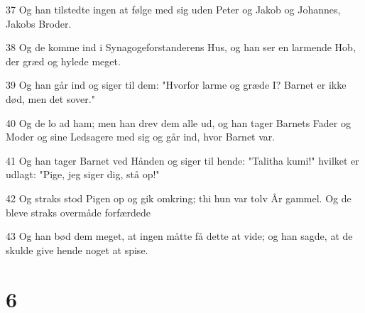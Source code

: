 \par 37 Og han tilstedte ingen at følge med sig uden Peter og Jakob og Johannes, Jakobs Broder.
\par 38 Og de komme ind i Synagogeforstanderens Hus, og han ser en larmende Hob, der græd og hylede meget.
\par 39 Og han går ind og siger til dem: "Hvorfor larme og græde I? Barnet er ikke død, men det sover."
\par 40 Og de lo ad ham; men han drev dem alle ud, og han tager Barnets Fader og Moder og sine Ledsagere med sig og går ind, hvor Barnet var.
\par 41 Og han tager Barnet ved Hånden og siger til hende: "Talitha kumi!" hvilket er udlagt: "Pige, jeg siger dig, stå op!"
\par 42 Og straks stod Pigen op og gik omkring; thi hun var tolv År gammel. Og de bleve straks overmåde forfærdede
\par 43 Og han bød dem meget, at ingen måtte få dette at vide; og han sagde, at de skulde give hende noget at spise.

\chapter{6}

